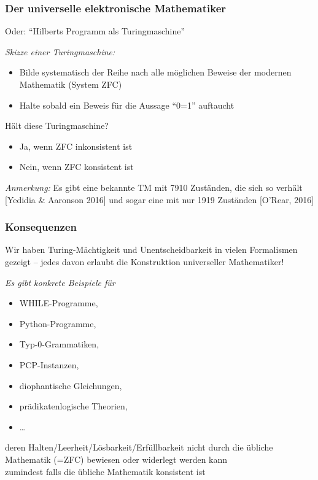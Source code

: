 \documentclass[onlymath]{beamer}
\begin{document}
\begin{frame}\frametitle{Der universelle elektronische Mathematiker}

Oder: "`Hilberts Programm als Turingmaschine"'
\bigskip

\emph{Skizze einer Turingmaschine:}
\begin{itemize}
\item Bilde systematisch der Reihe nach alle möglichen Beweise der modernen Mathematik (System ZFC)
\item Halte sobald ein Beweis für die Aussage "`0=1"' auftaucht
\end{itemize}
\alert{Hält diese Turingmaschine?}\pause
\begin{itemize}
\item Ja, wenn ZFC inkonsistent ist
\item Nein, wenn ZFC konsistent ist
\end{itemize}\pause
\bigskip

\pause\medskip

\emph{Anmerkung:} Es gibt eine bekannte TM mit 7910 Zuständen, die sich so verhält [Yedidia \& Aaronson 2016] und sogar eine mit nur 1919 Zuständen [O’Rear, 2016]

\end{frame}

\begin{frame}\frametitle{Konsequenzen}

Wir haben Turing-Mächtigkeit und Unentscheidbarkeit in vielen Formalismen gezeigt -- jedes davon erlaubt die Konstruktion universeller Mathematiker!
\bigskip

\emph{Es gibt konkrete Beispiele für}
\begin{itemize}
\item WHILE-Programme,
\item Python-Programme,
\item Typ-0-Grammatiken,
\item PCP-Instanzen,
\item diophantische Gleichungen,
\item prädikatenlogische Theorien,
\item \ldots
\end{itemize}
deren Halten/Leerheit/Lösbarkeit/Erfüllbarkeit nicht durch die übliche Mathematik (=ZFC) bewiesen oder widerlegt werden kann\\[-0.5ex]
{\tiny zumindest falls die übliche Mathematik konsistent ist}

\end{frame}
\end{document}
